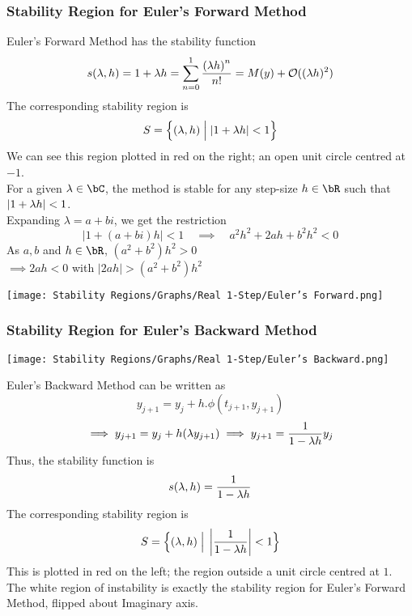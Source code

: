 \subsubsection{Stability Region for Euler's Forward Method}
\begin{multicols}{2}
\vspace*{\fill}

Euler's Forward Method has the stability function
\[s(\lambda, h) = 1 + \lambda h = \sum\limits_{n=0}^{1} \frac{{(\lambda h)}^n}{n!} = M(y) + \mathcal{O}((\lambda h)^2)\]
The corresponding stability region is 
\[S = \Big\{ (\lambda, h) \;\Big|\; |1 + \lambda h| < 1\Big\}\]
We can see this region plotted in red on the right; an open unit circle centred at $-1$.\\
For a given $\lambda \in \bC$, the method is stable for any step-size $h \in \bR$ such that $|1 + \lambda h| < 1$.\\
Expanding $\lambda = a + bi$, we get the restriction
\[|1 + (a + bi)h| < 1 \quad \implies \quad a^2h^2 + 2ah + b^2h^2 < 0\]
As $a, b$ and $h \in \bR$, $(a^2 +b^2)h^2 > 0$\\
$\implies 2ah < 0$ with $|2ah| > (a^2 + b^2)h^2$

\vspace*{\fill}
\columnbreak{}
\begin{center}
\texttt{[image: Stability Regions/Graphs/Real 1-Step/Euler's Forward.png]}
\end{center}
\end{multicols}

\subsubsection{Stability Region for Euler's Backward Method}
\begin{multicols}{2}
\begin{center}
\texttt{[image: Stability Regions/Graphs/Real 1-Step/Euler's Backward.png]}
\end{center}
\columnbreak{}
\vspace*{\fill}

Euler's Backward Method can be written as
\[y_{j+1} = y_j + h.\phi(t_{j+1}, y_{j+1})\]
\[\implies y_{j+1} = y_j + h(\lambda y_{j+1}) \implies y_{j+1} = \frac{1}{1 - \lambda h}y_j\]
Thus, the stability function is
\[s(\lambda, h) = \frac{1}{1 - \lambda h}\]
The corresponding stability region is
\[S = \Big\{ (\lambda, h) \;\Big|\; \left|\frac{1}{1 - \lambda h}\right| < 1\Big\}\]
This is plotted in red on the left; the region outside a unit circle centred at $1$.\\
The white region of instability is exactly the stability region for Euler's Forward Method, flipped about Imaginary axis.\\
\vspace*{\fill}
\end{multicols}

